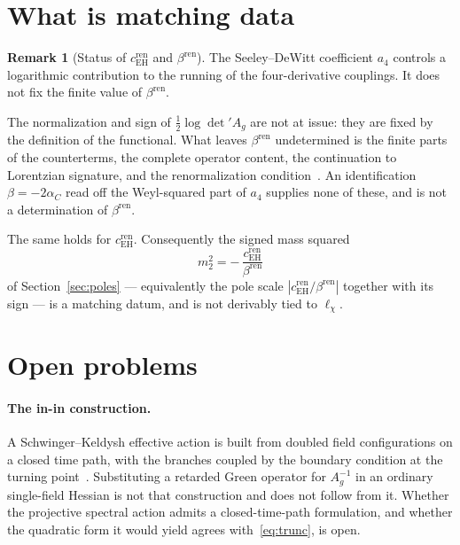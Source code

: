 \documentclass[12pt,a4paper]{article}
\theoremstyle{definition}
\newtheorem{remark}[theorem]{Remark}
\newcommand{\Ag}{A_g}
\newcommand{\cEH}{c_{\mathrm{EH}}}
\begin{document}
  \section{What is matching data}
    \label{sec:matching}

    \begin{remark}[Status of $\cEH^{\mathrm{ren}}$ and $\beta^{\mathrm{ren}}$]
      \label{rem:matching}
      The Seeley--DeWitt coefficient $a_4$ controls a logarithmic contribution to the running of the
      four-derivative couplings. It does not fix the finite value of $\beta^{\mathrm{ren}}$.

      The normalization and sign of $\tfrac12\log\det{}'\Ag$ are not at issue: they are fixed by the definition of
      the functional. What leaves $\beta^{\mathrm{ren}}$ undetermined is the finite parts of the counterterms, the
      complete operator content, the continuation to Lorentzian signature, and the renormalization
      condition~\cite{Vassilevich2003}. An identification $\beta = -2\alpha_C$ read off the Weyl-squared part of
      $a_4$ supplies none of these, and is not a determination of $\beta^{\mathrm{ren}}$.

      The same holds for $\cEH^{\mathrm{ren}}$. Consequently the signed mass squared
      \[
        m_2^2 = -\,\frac{\cEH^{\mathrm{ren}}}{\beta^{\mathrm{ren}}}
      \]
      of Section~\ref{sec:poles} --- equivalently the pole scale $|\cEH^{\mathrm{ren}}/\beta^{\mathrm{ren}}|$
      together with its sign --- is a matching datum, and is not derivably tied to $\ell_\chi$.
    \end{remark}

  \section{Open problems}
    \label{sec:open}

    \paragraph{The in-in construction.}
      A Schwinger--Keldysh effective action is built from doubled field configurations on a closed time path, with
      the branches coupled by the boundary condition at the turning point~\cite{Jordan1986,Calzetta2008}.
      Substituting a retarded Green operator for $\Ag^{-1}$ in an ordinary single-field Hessian is not that
      construction and does not follow from it. Whether the projective spectral action admits a closed-time-path
      formulation, and whether the quadratic form it would yield agrees with~\eqref{eq:trunc}, is open.
\end{document}

